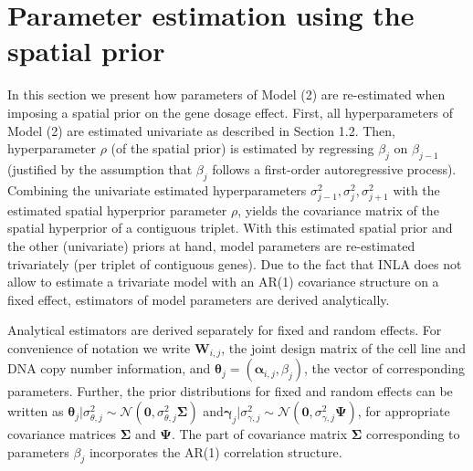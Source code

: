 \section{Parameter estimation using the spatial prior}
In this section we present how parameters of Model (2) are re-estimated when imposing a spatial prior on the gene dosage effect. First, all hyperparameters of Model (2) are estimated univariate as described in Section 1.2. Then, hyperparameter $\rho$ (of the spatial prior) is estimated by regressing $\beta_j$ on $\beta_{j-1}$ (justified by the assumption that $\beta_j$ follows a first-order autoregressive process). Combining the univariate estimated hyperparameters $\sigma_{j-1}^2, \sigma_{j}^2, \sigma_{j+1}^2$ with the estimated spatial hyperprior parameter $\rho$, yields the covariance matrix of the spatial hyperprior of a contiguous triplet. With this estimated spatial prior and the other (univariate) priors at hand, model parameters are re-estimated trivariately (per triplet of contiguous genes). Due to the fact that INLA does not allow to estimate a trivariate model with an AR(1) covariance structure on a fixed effect, estimators of model parameters are derived analytically.


Analytical estimators are derived separately for fixed and random effects. For convenience of notation we write $\mathbf{W}_{i,j}$, the joint design matrix of the cell line and DNA copy number information, and $\boldsymbol{\theta}_j=(\boldsymbol{\alpha}_{i,j}, \beta_j)$, the vector of corresponding parameters. Further, the prior distributions for fixed and random effects can be written as $\boldsymbol{\theta}_j|\sigma_{\theta,j}^2\sim \mathcal{N}(\mathbf{0},\sigma_{\theta,j}^2 \mathbf{\Sigma})$ and$\boldsymbol{\gamma}_j|\sigma_{\gamma,j}^2\sim \mathcal{N}(\mathbf{0},\sigma_{\gamma,j}^2 \mathbf{\Psi})$, for appropriate covariance matrices  $\mathbf{\Sigma}$ and $\mathbf{\Psi}$. The part of covariance matrix $\mathbf{\Sigma}$ corresponding to parameters $\beta_j$ incorporates the AR(1) correlation structure.
 

